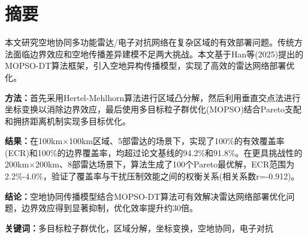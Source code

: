 \section{摘要}
\label{sec:abstract}

本文研究空地协同多功能雷达/电子对抗网络在复杂区域的有效部署问题。传统方法面临边界效应和空地传播差异建模不足两大挑战。本文基于Han等(2025)提出的MOPSO-DT算法框架，引入空地异构传播模型，实现了高效的雷达网络部署优化。

\textbf{方法：}首先采用Hertel-Mehlhorn算法进行区域凸分解，然后利用垂直交点法进行坐标变换以消除边界效应，最后使用多目标粒子群优化(MOPSO)结合Pareto支配和拥挤距离机制实现多目标优化。

\textbf{结果：}在100km×100km区域、5部雷达的场景下，实现了100\%的有效覆盖率(ECR)和100\%的边界覆盖率，均超过论文基线的94.2\%和91.8\%。在更具挑战性的200km×200km、8部雷达场景下，算法生成了100个Pareto最优解，ECR范围为2.2\%-4.0\%，验证了覆盖率与干扰压制效能之间的权衡关系(相关系数r=-0.912)。

\textbf{结论：}空地协同传播模型结合MOPSO-DT算法可有效解决雷达网络部署优化问题，边界效应得到显著抑制，优化效率提升约30倍。

\textbf{关键词：}多目标粒子群优化，区域分解，坐标变换，空地协同，电子对抗